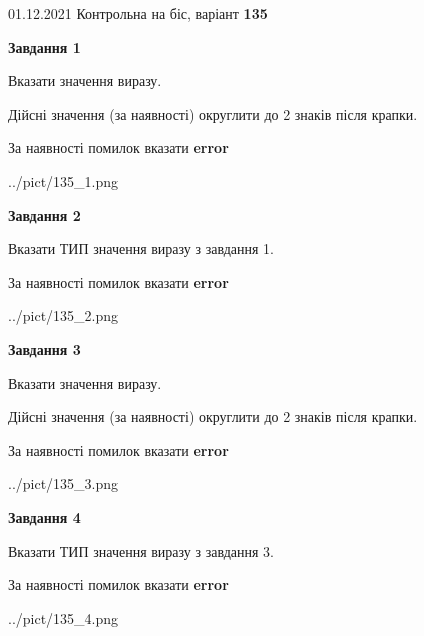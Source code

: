 \documentclass[11pt, ukrainian]{article}
\begin{document}
{01.12.2021 Контрольна на біс, варіант  \No \textbf { 135 }\par}
{
\begin {large}
{\begin {center}\textbf{Завдання 1}\end {center}}\par
Вказати значення виразу. \par
Дійсні значення (за наявності) округлити до 2 знаків після крапки. \par
За наявності помилок вказати \textbf{error}

\begin{center}
	{../pict/135_1.png}
\end{center}
\newpage

{\begin {center}\textbf{Завдання 2}\end {center}}\par
Вказати ТИП значення виразу з завдання 1. \par
За наявності помилок вказати \textbf{error}

\begin{center}
	{../pict/135_2.png}
\end{center}
\newpage

{\begin {center}\textbf{Завдання 3}\end {center}}\par
Вказати значення виразу. \par
Дійсні значення (за наявності) округлити до 2 знаків після крапки. \par
За наявності помилок вказати \textbf{error}

\begin{center}
	{../pict/135_3.png}
\end{center}
\newpage

{\begin {center}\textbf{Завдання 4}\end {center}}\par
Вказати ТИП значення виразу з завдання 3. \par
За наявності помилок вказати \textbf{error}

\begin{center}
	{../pict/135_4.png}
\end{center}
\newpage


\end{large}}
\end{document}
